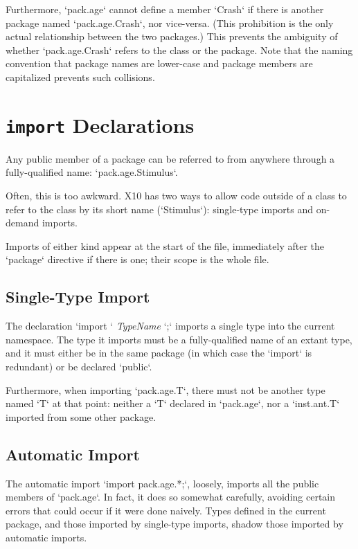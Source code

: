 Furthermore, \xcd`pack.age` cannot define a member \xcd`Crash` if there is
another package named \xcd`pack.age.Crash`, nor vice-versa. (This prohibition
is the only actual relationship between the two packages.)  This prevents the
ambiguity of whether \xcd`pack.age.Crash` refers to the class or the package.  
Note that the naming convention that package names are lower-case and package
members are capitalized prevents such collisions.


\section{{\tt import} Declarations}

Any public member of a package can be referred to from anywhere through a
fully-qualified name: \xcd`pack.age.Stimulus`.    

Often, this is too awkward.  X10 has two ways to allow code outside of a class
to refer to the class by its short name (\xcd`Stimulus`): single-type imports
and on-demand imports.   

Imports of either kind appear at the start of the file, immediately after the
\xcd`package` directive if there is one; their scope is the whole file.

\subsection{Single-Type Import}

The declaration \xcd`import ` {\em TypeName} \xcd`;` imports a single type
into the current namespace.  The type it imports must be a fully-qualified
name of an extant type, and it must either be in the same package (in which
case the \xcd`import` is redundant) or be declared \xcd`public`.  

Furthermore, when importing \xcd`pack.age.T`, there must not be another type
named \xcd`T` at that point: neither a  \xcd`T` declared in \xcd`pack.age`,
nor a \xcd`inst.ant.T` imported from some other package.

\subsection{Automatic Import}

The automatic import \xcd`import pack.age.*;`, loosely, imports all the public
members of \xcd`pack.age`.  In fact, it does so somewhat carefully, avoiding
certain errors that could occur if it were done naively.  Types defined in the
current package, and those imported by single-type imports, shadow those
imported by automatic imports.  

